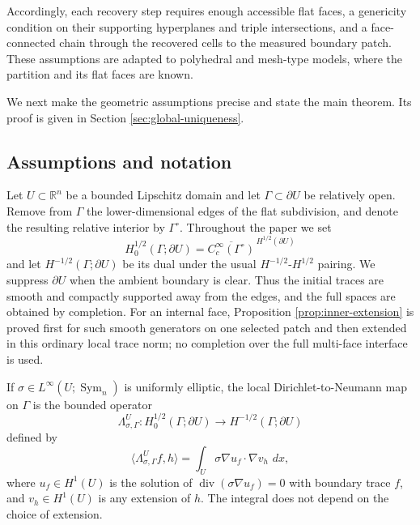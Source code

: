 \documentclass[10pt,a4paper]{amsart}
\newcommand{\R}{\mathbb R}
\newcommand{\dd}{\,d}
\newcommand{\DN}{\Lambda}
\newcommand{\Sym}{\operatorname{Sym}}
\newcommand{\diver}{\operatorname{div}}
\begin{document}
Accordingly, each recovery step requires enough accessible flat faces, a
genericity condition on their supporting hyperplanes and triple intersections,
and a face-connected chain through the recovered cells to the measured boundary
patch.  These assumptions are adapted to polyhedral and mesh-type models, where
the partition and its flat faces are known.

We next make the geometric assumptions precise and state the main theorem.  Its
proof is given in Section \ref{sec:global-uniqueness}.

\subsection{Assumptions and notation}
\label{sec:local-dn}

Let \(U\subset\R^n\) be a bounded Lipschitz domain and let
\(\Gamma\subset\partial U\) be relatively open.  Remove from \(\Gamma\) the
lower-dimensional edges of the flat subdivision, and denote the resulting
relative interior by \(\Gamma^\circ\).  Throughout the paper we set
\begin{equation}
  H^{1/2}_0(\Gamma;\partial U)
  =\overline{C_c^\infty(\Gamma^\circ)}^{\,H^{1/2}(\partial U)}
\end{equation}
and let \(H^{-1/2}(\Gamma;\partial U)\) be its dual under the usual
\(H^{-1/2}\)-\(H^{1/2}\) pairing.  We suppress \(\partial U\) when the ambient
  boundary is clear.  Thus the initial traces are smooth and compactly supported
  away from the edges, and the full spaces are obtained by completion.  For an
  internal face, Proposition \ref{prop:inner-extension} is proved first for such
  smooth generators on one selected patch and then extended in this ordinary
  local trace norm; no completion over the full multi-face interface is used.

If \(\sigma\in L^\infty(U;\Sym_n)\) is uniformly elliptic, the local
Dirichlet-to-Neumann map on \(\Gamma\) is the bounded operator
\begin{equation}
  \DN^U_{\sigma,\Gamma}:H^{1/2}_0(\Gamma;\partial U)
     \to H^{-1/2}(\Gamma;\partial U)
\end{equation}
defined by
\begin{equation}
  \langle \DN^U_{\sigma,\Gamma}f,h\rangle
  =\int_U \sigma\nabla u_f\cdot \nabla v_h\,\dd x,
  \label{eq:local-dn}
\end{equation}
where \(u_f\in H^1(U)\) is the solution of
\(\diver(\sigma\nabla u_f)=0\) with boundary trace \(f\), and
\(v_h\in H^1(U)\) is any extension of \(h\).  The integral does not depend on
the choice of extension.
\end{document}
